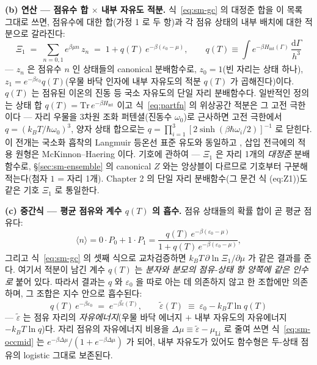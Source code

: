 \documentclass[11pt,a4paper]{article}
\newcommand{\dd}{\mathrm{d}}
\begin{document}
\textbf{(b) 연산 --- 점유수 합 $\times$ 내부 자유도 적분.} 식~\eqref{eq:sm-gc} 의 대정준 합을 이 목록
그대로 쓰면, 점유수에 대한 합(가정 1 로 두 항)과 각 점유 상태의 내부 배치에 대한 적분으로 갈라진다:
\begin{equation}
\Xi_1\;=\;\sum_{n=0,1}e^{\beta\mu n}\,z_n
\;=\;1+q(T)\,e^{-\beta(\varepsilon_0-\mu)},
\qquad
q(T)\equiv\int e^{-\beta H_\mathrm{int}(\Gamma)}\,\frac{\dd\Gamma}{h^3}
\label{eq:partfn}
\end{equation}
--- $z_n$ 은 점유수 $n$ 인 상태들의 canonical 분배함수로, $z_0=1$(빈 자리는 상태 하나),
$z_1=e^{-\beta\varepsilon_0}q(T)$(우물 바닥 인자에 내부 자유도의 적분 $q(T)$ 가 곱해진다)이다.
$q(T)$ 는 점유된 이온의 진동 등 국소 자유도의 단일 자리 분배함수다. 일반적인 정의는 상태
합 $q(T)=\mathrm{Tr}\,e^{-\beta H_\mathrm{int}}$ 이고 식~\eqref{eq:partfn} 의 위상공간 적분은 그 고전
극한이다 — 자리 우물을 3차원 조화 퍼텐셜(진동수 $\omega_0$)로 근사하면 고전 극한에서
$q=(k_BT/\hbar\omega_0)^3$, 양자 상태 합으로는
$q=\prod_{i=1}^{3}[2\sinh(\beta\hbar\omega_i/2)]^{-1}$ 로 닫힌다. 이 전개는 국소화
흡착의 Langmuir 등온선 표준 유도와 동일하고 \cite{hill1960,fowler1939,mcquarrie1976}, 삽입 전극에의
적용 원형은 McKinnon--Haering \cite{mckinnon1983} 이다. 기호에 관하여 --- $\Xi_1$ 은 자리 1개의
\emph{대정준} 분배함수로, \S\ref{sec:sm-ensemble} 의 canonical $Z$ 와는 앙상블이 다르므로 기호부터
구분해 적는다(첨자 $1$ = 자리 1개). Chapter 2 의 단일 자리 분배함수(그 문건 식 (eq:Z1))도 같은 기호
$\Xi_1$ 로 통일한다.

\textbf{(c) 중간식 --- 평균 점유와 계수 $q(T)$ 의 흡수.} 점유 상태들의 확률 합이 곧 평균 점유다:
\begin{equation}
\langle n\rangle=0\cdot P_0+1\cdot P_1
=\frac{q(T)\,e^{-\beta(\varepsilon_0-\mu)}}{1+q(T)\,e^{-\beta(\varepsilon_0-\mu)}},
\label{eq:sm-occmid}
\end{equation}
그리고 식~\eqref{eq:sm-gc} 의 셋째 식으로 교차검증하면 $k_BT\,\partial\ln\Xi_1/\partial\mu$ 가 같은
결과를 준다. 여기서 적분이 남긴 계수 $q(T)$ 는 \emph{분자와 분모의 점유-상태 항 양쪽에 같은 인수로}
붙어 있다. 따라서 결과는 $q$ 와 $\varepsilon_0$ 을 따로 아는 데 의존하지 않고 한 조합에만 의존하며,
그 조합은 지수 안으로 흡수된다:
\begin{equation}
q(T)\,e^{-\beta\varepsilon_0}\;=\;e^{-\beta\tilde\varepsilon(T)},
\qquad
\tilde\varepsilon(T)\;\equiv\;\varepsilon_0-k_BT\ln q(T)
\label{eq:sm-epstilde}
\end{equation}
--- $\tilde\varepsilon$ 는 점유 자리의 \emph{자유에너지}(우물 바닥 에너지 $+$ 내부 자유도의 자유에너지
$-k_BT\ln q$)다. 자리 점유의 자유에너지 비용을 $\Delta\mu\equiv\tilde\varepsilon-\mu_\mathrm{Li}$ 로
줄여 쓰면 식~\eqref{eq:sm-occmid} 는 $e^{-\beta\Delta\mu}/(1+e^{-\beta\Delta\mu})$ 가 되어, 내부
자유도가 있어도 함수형은 두-상태 점유의 logistic 그대로 보존된다.
\end{document}
